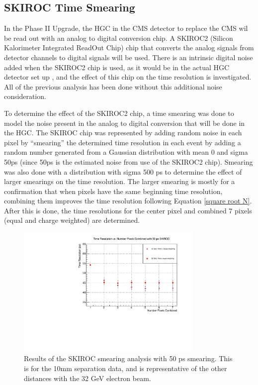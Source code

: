 \documentclass[twocolumn,aps,prd,reprint]{revtex4-1}
\begin{document}
\subsection{SKIROC Time Smearing}

In the Phase II Upgrade, the HGC in the CMS detector to replace the CMS wil be read out with an analog to digital conversion chip. A SKIROC2 (Silicon Kalorimeter Integrated ReadOut Chip) chip that converts the analog signals from detector channels to digital signals will be used. There is an intrinsic digital noise added when the SKIROC2 chip is used, as it would be in the actual HGC detector set up \cite{Callier}, and the effect of this chip on the time resolution is investigated. All of the previous analysis has been done without this additional noise consideration.

To determine the effect of the SKIROC2 chip, a time smearing was done to model the noise present in the analog to digital conversion that will be done in the HGC. The SKIROC chip was represented by adding random noise in each pixel by ``smearing'' the determined time resolution in each event by adding a random number generated from a Gaussian distribution with mean 0 and sigma 50ps (since 50ps is the estimated noise from use of the SKIROC2 chip). Smearing was also done with a distribution with sigma 500 ps to determine the effect of larger smearings on the time resolution. The larger smearing is mostly for a confirmation that when pixels have the same beginning time resolution, combining them improves the time resolution following Equation \ref{square root N}. After this is done, the time resolutions for the center pixel and combined 7 pixels (equal and charge weighted) are determined.

\begin{figure}[!htbp]
\centering
\includegraphics[width = 0.8\textwidth]{smearing_50_10mm}
\caption{Results of the SKIROC smearing analysis with 50 ps smearing. This is for the 10mm separation data, and is representative of the other distances with the 32 GeV electron beam.}
\label{50 smearing}
\end{figure}
\end{document}

